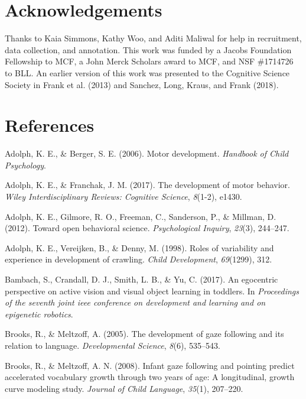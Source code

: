 \documentclass[english,man]{apa6}
\begin{document}
\section{Acknowledgements}\label{acknowledgements}

Thanks to Kaia Simmons, Kathy Woo, and Aditi Maliwal for help in
recruitment, data collection, and annotation. This work was funded by a
Jacobs Foundation Fellowship to MCF, a John Merck Scholars award to MCF,
and NSF \#1714726 to BLL. An earlier version of this work was presented
to the Cognitive Science Society in Frank et al. (2013) and Sanchez,
Long, Kraus, and Frank (2018).

\newpage

\section{References}\label{references}

\begingroup
\setlength{\parindent}{-0.5in} \setlength{\leftskip}{0.5in}

\hypertarget{refs}{}
\hypertarget{ref-adolph2006motor}{}
Adolph, K. E., \& Berger, S. E. (2006). Motor development.
\emph{Handbook of Child Psychology}.

\hypertarget{ref-adolph2017development}{}
Adolph, K. E., \& Franchak, J. M. (2017). The development of motor
behavior. \emph{Wiley Interdisciplinary Reviews: Cognitive Science},
\emph{8}(1-2), e1430.

\hypertarget{ref-adolph2012toward}{}
Adolph, K. E., Gilmore, R. O., Freeman, C., Sanderson, P., \& Millman,
D. (2012). Toward open behavioral science. \emph{Psychological Inquiry},
\emph{23}(3), 244--247.

\hypertarget{ref-adolph1998roles}{}
Adolph, K. E., Vereijken, B., \& Denny, M. (1998). Roles of variability
and experience in development of crawling. \emph{Child Development},
\emph{69}(1299), 312.

\hypertarget{ref-bambach2017}{}
Bambach, S., Crandall, D. J., Smith, L. B., \& Yu, C. (2017). An
egocentric perspective on active vision and visual object learning in
toddlers. In \emph{Proceedings of the seventh joint ieee conference on
development and learning and on epigenetic robotics}.

\hypertarget{ref-brooks2005}{}
Brooks, R., \& Meltzoff, A. (2005). The development of gaze following
and its relation to language. \emph{Developmental Science}, \emph{8}(6),
535--543.

\hypertarget{ref-brooks2008}{}
Brooks, R., \& Meltzoff, A. N. (2008). Infant gaze following and
pointing predict accelerated vocabulary growth through two years of age:
A longitudinal, growth curve modeling study. \emph{Journal of Child
Language}, \emph{35}(1), 207--220.
\end{document}
